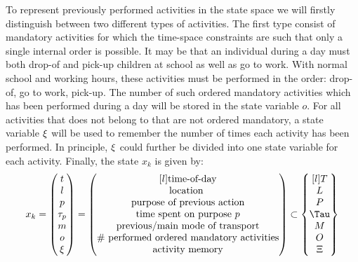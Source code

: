 To represent previously performed activities in the state space we will firstly distinguish between two different types of activities. The first type consist of mandatory activities for which the time-space constraints are such that only a single internal order is possible. It may be that an individual during a day must both drop-of and pick-up children at school as well as go to work. With normal school and working hours, these activities must be performed in the order: drop-of, go to work, pick-up. The number of such ordered mandatory activities which has been performed during a day will be stored in the state variable $o$. For all activities that does not belong to that are not ordered mandatory, a state variable $\xi$ will be used to remember the number of times each activity has been performed. In principle, $\xi$ could further be divided into one state variable for each activity. Finally, the state $x_k$ is given by:
\begin{equation}
    x_k = \begin{pmatrix}
    t \\
    l \\
    p \\
    \atime_p\\
    m \\
    o \\
    \amem
    \end{pmatrix} =
    \begin{pmatrix*}[l]
    \text{time-of-day} \\
    \text{location } \\
    \text{purpose of previous action} \\
    \text{time spent on purpose $p$} \\
    \text{previous/main mode of transport} \\
    \text{\# performed ordered mandatory activities} \\
    \text{activity memory} \\
    \end{pmatrix*}
    \subset
    \begin{Bmatrix*}[l]
    T \\
    L \\
    P \\
    \Tau \\
    M \\
    O \\
    \Xi 
    \end{Bmatrix*}
\end{equation}

